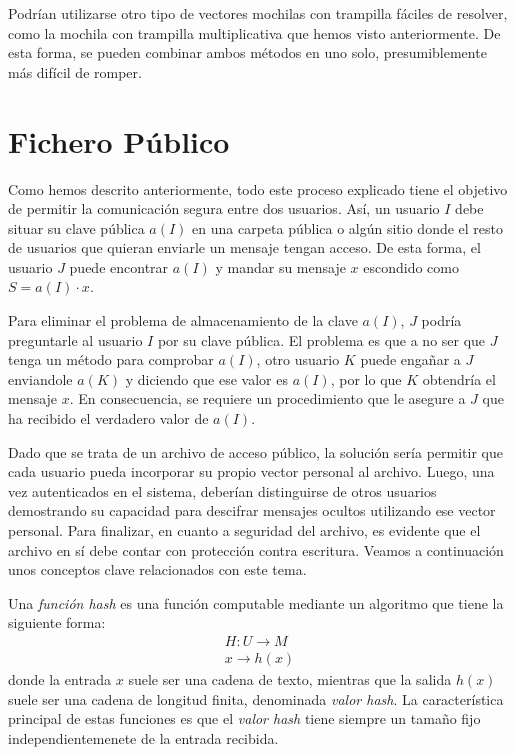     Podrían utilizarse otro tipo de vectores mochilas con trampilla fáciles de resolver, como la mochila con trampilla multiplicativa que hemos visto anteriormente. De esta forma, se pueden combinar ambos métodos en uno solo, presumiblemente más difícil de romper.
    
    \section{Fichero Público}

    Como hemos descrito anteriormente, todo este proceso explicado tiene el objetivo de permitir la comunicación segura entre dos usuarios. Así, un usuario $I$ debe situar su clave pública $a(I)$ en una carpeta pública o algún sitio donde el resto de usuarios que quieran enviarle un mensaje tengan acceso. De esta forma, el usuario $J$ puede encontrar $a(I)$ y mandar su mensaje $x$ escondido como $S = a(I) \cdot  x$. 

    Para eliminar el problema de almacenamiento de la clave $a(I)$, $J$ podría preguntarle al usuario $I$ por su clave pública. El problema es que a no ser que $J$ tenga un método para comprobar $a(I)$, otro usuario $K$ puede engañar a $J$ enviandole $a(K)$ y diciendo que ese valor es $a(I)$, por lo que $K$ obtendría el mensaje $x$. En consecuencia, se requiere un procedimiento que le asegure a $J$ que ha recibido el verdadero valor de $a(I)$.

    Dado que se trata de un archivo de acceso público, la solución sería permitir que cada usuario pueda incorporar su propio vector personal al archivo. Luego, una vez autenticados en el sistema, deberían distinguirse de otros usuarios demostrando su capacidad para descifrar mensajes ocultos utilizando ese vector personal. Para finalizar, en cuanto a seguridad del archivo, es evidente que el archivo en sí debe contar con protección contra escritura. Veamos a continuación unos conceptos clave relacionados con este tema.

    \begin{definicion} \cite{artTiwari, RSALab} 
        Una \textit{función hash} es una función computable mediante un algoritmo que tiene la siguiente forma:
        \begin{align}
            H: U \rightarrow M \\
            x \rightarrow h(x)
        \end{align}
        donde la entrada $x$ suele ser una cadena de texto, mientras que la salida $h(x)$ suele ser una cadena de longitud finita, denominada \textit{valor hash}. La característica principal de estas funciones es que el \textit{valor hash} tiene siempre un tamaño fijo independientemenete de la entrada recibida.
    \end{definicion}
 
